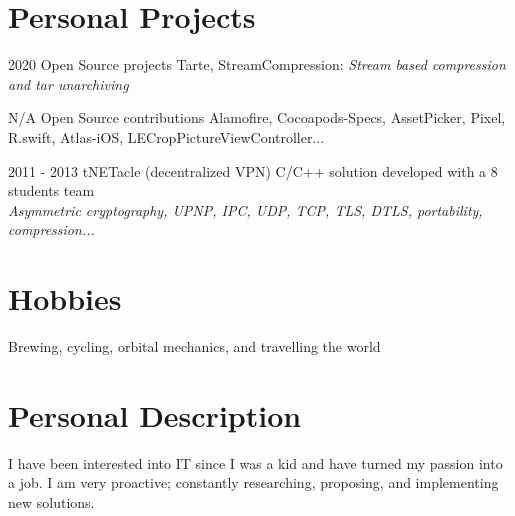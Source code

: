 \documentclass[]{template/friggeri-cv} %
\begin{document}

\section{Personal Projects}
\begin{entrylist}

\entry
{2020}
{Open Source projects}
{}
{Tarte, StreamCompression: \emph{Stream based compression and tar unarchiving}}


\entry
{N/A}
{Open Source contributions}
{}
{Alamofire, Cocoapods-Specs, AssetPicker, Pixel,  R.swift, Atlas-iOS, LECropPictureViewController...}


  \entry
      {2011 - 2013}
      {tNETacle (decentralized VPN)}
      {}
      {C/C++ solution developed with a 8 students team \\
      \emph{Asymmetric cryptography, UPNP, IPC, UDP, TCP, TLS, DTLS, portability, compression...}}


\end{entrylist}


\section{Hobbies}

{Brewing, cycling, orbital mechanics, and travelling the world}

\section{Personal Description}
        {
          I have been interested into IT since I was a kid and have turned my passion into a job.
          I am very proactive; constantly researching, proposing, and implementing new solutions.
        }
\end{document}
